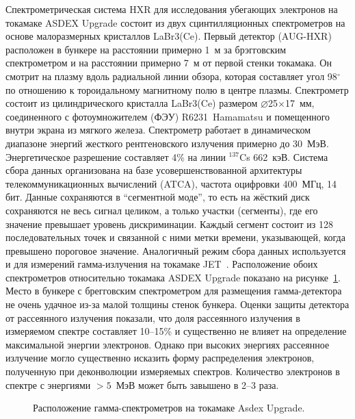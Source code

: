 Спектрометрическая система HXR для исследования убегающих электронов на токамаке ASDEX Upgrade состоит из двух сцинтилляционных спектрометров на основе малоразмерных кристаллов LaBr3(Ce). Первый детектор (AUG-HXR) расположен в бункере на расстоянии примерно 1~м за брэгговским спектрометром и на расстоянии примерно 7~м от первой стенки токамака. Он смотрит на плазму вдоль радиальной линии обзора, которая составляет угол 98${}^{\circ}$ по отношению к тороидальному магнитному полю в центре плазмы. Спектрометр состоит из цилиндрического кристалла LaBr3(Ce) размером $\varnothing$25$\times$17~мм, соединенного с фотоумножителем (ФЭУ) R6231~Hamamatsu и помещенного внутри экрана из мягкого железа. Спектрометр работает в динамическом диапазоне энергий жесткого рентгеновского излучения примерно до 30~МэВ. Энергетическое разрешение составляет 4\% на линии ${}^{137}$Cs 662~кэВ. Система сбора данных организована на базе усовершенствованной архитектуры телекоммуникационных вычислений (ATCA), частота оцифровки 400~МГц, 14 бит. Данные сохраняются в ``сегментной моде'', то есть на жёсткий диск сохраняются не весь сигнал целиком, а только участки (сегменты), где его значение превышает уровень дискриминации. Каждый сегмент состоит из 128 последовательных точек и связанной с ними метки времени, указывающей, когда превышено пороговое значение. Аналогичный режим сбора данных используется и для измерений гамма-излучения на токамаке JET~\cite{Pereira2008}. Расположение обоих спектрометров относительно токамака ASDEX Upgrade показано на рисунке~\ref{fig:asdexSpectrometersPosition}. 
Место в бункере с брегговским спектрометром для размещения гамма-детектора не очень удачное из-за малой толщины стенок бункера. Оценки защиты детектора от рассеянного излучения показали, что доля рассеянного излучения в измеряемом спектре составляет 10--15\% и существенно не влияет на определение максимальной энергии электронов. Однако при высоких энергиях рассеянное излучение могло существенно исказить форму распределения электронов, полученную при деконволюции измеряемых спектров. Количество электронов в спектре с энергиями $>5$~МэВ может быть завышено в 2--3 раза.~\cite{Shevelev2021,Nocente2018}

\begin{figure}[ht!]
  \caption{ Расположение гамма-спектрометров на токамаке Asdex Upgrade.~\cite{Shevelev2021} }
  \label{fig:asdexSpectrometersPosition}
\end{figure}

